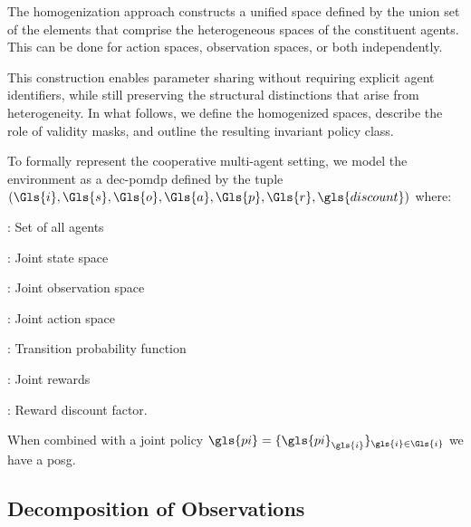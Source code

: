 \documentclass[]{jair}
\begin{document}
The homogenization approach constructs a unified space defined by the union set 
of the elements that comprise the heterogeneous spaces of the constituent agents.
This can be done for action spaces, observation spaces, or both independently.

This construction enables parameter sharing without requiring explicit agent identifiers, 
while still preserving the structural distinctions that arise from heterogeneity. 
In what follows, we define the homogenized spaces, describe the role of validity masks, 
and outline the resulting invariant policy class.

To formally represent the cooperative multi-agent setting,
we model the environment as a \gls{dec-pomdp}
defined by the tuple \((\Gls{i},\Gls{s},\Gls{o},\Gls{a},\Gls{p},\Gls{r},\gls{discount})\) where:
%
\begin{description}[labelindent=2em, labelwidth=5em, itemsep=3pt, topsep=8pt]
    \item[\(\Gls{i}\)] : Set of all agents
    \item[\(\Gls{s} = \{\Gls{s}_{\gls{i}}\}_{\gls{i}\in \Gls{i}}\)] : Joint state space
    \item[\(\Gls{o} = \{\Gls{o}_{\gls{i}}\}_{\gls{i}\in \Gls{i}}\)] : Joint observation space
    \item[\(\Gls{a} = \{\Gls{a}_{\gls{i}}\}_{\gls{i}\in \Gls{i}}\)] : Joint action space
    \item[\(\Gls{p}(\gls{s}^\prime|\gls{s},\gls{a})\)] : Transition probability function
    \item[\(\Gls{r} = \{\Gls{r}_{\gls{i}}\}_{\gls{i}\in \Gls{i}}\)] : Joint rewards
    \item[\gls{discount}] : Reward discount factor.
\end{description}
%
When combined with a joint policy \(\gls{pi} = \{\gls{pi}_{\gls{i}}\}_{\gls{i}\in \Gls{i}}\) 
we have a \gls{posg}.

\subsection{Decomposition of Observations}
\end{document}
